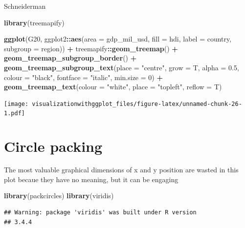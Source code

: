 \documentclass[]{krantz}
\makeatletter
\newenvironment{Shaded}{\begin{snugshade}}{\end{snugshade}}
\newcommand{\KeywordTok}[1]{\textcolor[rgb]{0.13,0.29,0.53}{\textbf{#1}}}
\newcommand{\DataTypeTok}[1]{\textcolor[rgb]{0.13,0.29,0.53}{#1}}
\newcommand{\DecValTok}[1]{\textcolor[rgb]{0.00,0.00,0.81}{#1}}
\newcommand{\FloatTok}[1]{\textcolor[rgb]{0.00,0.00,0.81}{#1}}
\newcommand{\StringTok}[1]{\textcolor[rgb]{0.31,0.60,0.02}{#1}}
\newcommand{\OperatorTok}[1]{\textcolor[rgb]{0.81,0.36,0.00}{\textbf{#1}}}
\newcommand{\NormalTok}[1]{#1}
\newenvironment{kframe}{%
\medskip{}
\setlength{\fboxsep}{.8em}
 \def\at@end@of@kframe{}%
 \ifinner\ifhmode%
  \def\at@end@of@kframe{\end{minipage}}%
  \begin{minipage}{\columnwidth}%
 \fi\fi%
 \def\FrameCommand##1{\hskip\@totalleftmargin \hskip-\fboxsep
 \colorbox{shadecolor}{##1}\hskip-\fboxsep
     \hskip-\linewidth \hskip-\@totalleftmargin \hskip\columnwidth}%
 \MakeFramed {\advance\hsize-\width
   \@totalleftmargin\z@ \linewidth\hsize
   \@setminipage}}%
 {\par\unskip\endMakeFramed%
 \at@end@of@kframe}
\renewenvironment{Shaded}{\begin{kframe}}{\end{kframe}}
\theoremstyle{definition}
\theoremstyle{definition}
\theoremstyle{definition}
\theoremstyle{remark}
\makeatother
\begin{document}
Schneiderman

\begin{Shaded}
\begin{Highlighting}[]
\KeywordTok{library}\NormalTok{(treemapify)}

\KeywordTok{ggplot}\NormalTok{(G20, ggplot2}\OperatorTok{::}\KeywordTok{aes}\NormalTok{(}\DataTypeTok{area =}\NormalTok{ gdp_mil_usd, }\DataTypeTok{fill =}\NormalTok{ hdi, }\DataTypeTok{label =}\NormalTok{ country, }\DataTypeTok{subgroup =}\NormalTok{ region)) }\OperatorTok{+}
\StringTok{  }\NormalTok{treemapify}\OperatorTok{::}\KeywordTok{geom_treemap}\NormalTok{() }\OperatorTok{+}
\StringTok{  }\KeywordTok{geom_treemap_subgroup_border}\NormalTok{() }\OperatorTok{+}
\StringTok{  }\KeywordTok{geom_treemap_subgroup_text}\NormalTok{(}\DataTypeTok{place =} \StringTok{"centre"}\NormalTok{, }\DataTypeTok{grow =}\NormalTok{ T, }\DataTypeTok{alpha =} \FloatTok{0.5}\NormalTok{, }\DataTypeTok{colour =}
                             \StringTok{"black"}\NormalTok{, }\DataTypeTok{fontface =} \StringTok{"italic"}\NormalTok{, }\DataTypeTok{min.size =} \DecValTok{0}\NormalTok{) }\OperatorTok{+}
\StringTok{  }\KeywordTok{geom_treemap_text}\NormalTok{(}\DataTypeTok{colour =} \StringTok{"white"}\NormalTok{, }\DataTypeTok{place =} \StringTok{"topleft"}\NormalTok{, }\DataTypeTok{reflow =}\NormalTok{ T)}
\end{Highlighting}
\end{Shaded}

\texttt{[image: visualizationwithggplot\_files/figure-latex/unnamed-chunk-26-1.pdf]}

\section{Circle packing}\label{circle-packing}

The most valuable graphical dimensions of x and y position are wasted in
this plot becaue they have no meaning, but it can be engaging

\begin{Shaded}
\begin{Highlighting}[]
\KeywordTok{library}\NormalTok{(packcircles)}
\KeywordTok{library}\NormalTok{(viridis)}
\end{Highlighting}
\end{Shaded}

\begin{verbatim}
## Warning: package 'viridis' was built under R version
## 3.4.4
\end{verbatim}
\end{document}
